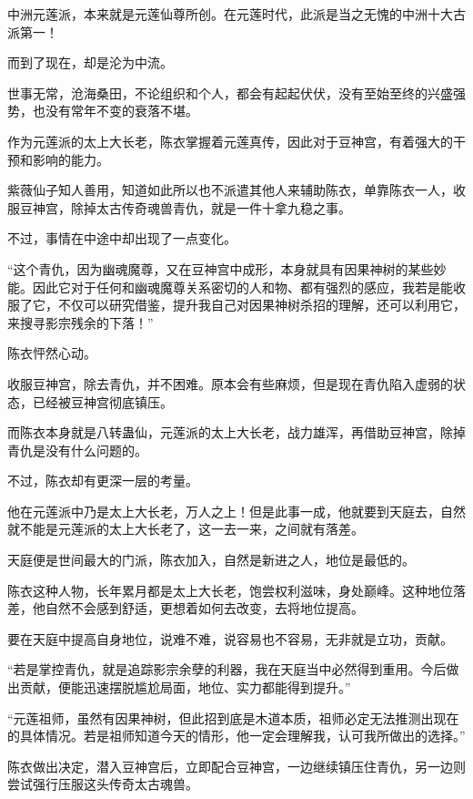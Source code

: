 
\begin{this_body}

中洲元莲派，本来就是元莲仙尊所创。在元莲时代，此派是当之无愧的中洲十大古派第一！

而到了现在，却是沦为中流。

世事无常，沧海桑田，不论组织和个人，都会有起起伏伏，没有至始至终的兴盛强势，也没有常年不变的衰落不堪。

作为元莲派的太上大长老，陈衣掌握着元莲真传，因此对于豆神宫，有着强大的干预和影响的能力。

紫薇仙子知人善用，知道如此所以也不派遣其他人来辅助陈衣，单靠陈衣一人，收服豆神宫，除掉太古传奇魂兽青仇，就是一件十拿九稳之事。

不过，事情在中途中却出现了一点变化。

“这个青仇，因为幽魂魔尊，又在豆神宫中成形，本身就具有因果神树的某些妙能。因此它对于任何和幽魂魔尊关系密切的人和物、都有强烈的感应，我若是能收服了它，不仅可以研究借鉴，提升我自己对因果神树杀招的理解，还可以利用它，来搜寻影宗残余的下落！”

陈衣怦然心动。

收服豆神宫，除去青仇，并不困难。原本会有些麻烦，但是现在青仇陷入虚弱的状态，已经被豆神宫彻底镇压。

而陈衣本身就是八转蛊仙，元莲派的太上大长老，战力雄浑，再借助豆神宫，除掉青仇是没有什么问题的。

不过，陈衣却有更深一层的考量。

他在元莲派中乃是太上大长老，万人之上！但是此事一成，他就要到天庭去，自然就不能是元莲派的太上大长老了，这一去一来，之间就有落差。

天庭便是世间最大的门派，陈衣加入，自然是新进之人，地位是最低的。

陈衣这种人物，长年累月都是太上大长老，饱尝权利滋味，身处巅峰。这种地位落差，他自然不会感到舒适，更想着如何去改变，去将地位提高。

要在天庭中提高自身地位，说难不难，说容易也不容易，无非就是立功，贡献。

“若是掌控青仇，就是追踪影宗余孽的利器，我在天庭当中必然得到重用。今后做出贡献，便能迅速摆脱尴尬局面，地位、实力都能得到提升。”

“元莲祖师，虽然有因果神树，但此招到底是木道本质，祖师必定无法推测出现在的具体情况。若是祖师知道今天的情形，他一定会理解我，认可我所做出的选择。”

陈衣做出决定，潜入豆神宫后，立即配合豆神宫，一边继续镇压住青仇，另一边则尝试强行压服这头传奇太古魂兽。


\end{this_body}
